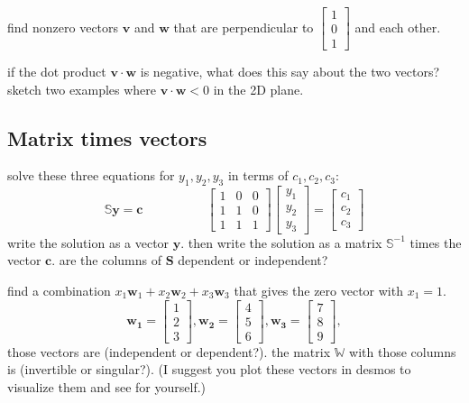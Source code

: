 \documentclass[addpoints]{exam}
\begin{document}
\begin{questions}
	\question find nonzero vectors $\mathbf{v}$ and $\mathbf{w}$ that are perpendicular to $\begin{bmatrix}  1\\0\\1 \end{bmatrix}$ and each other.
	
	\question if the dot product $\mathbf{v}\cdot \mathbf{w}$ is negative, what does this say about the two vectors? sketch two examples where $\mathbf{v}\cdot \mathbf{w} < 0$ in the 2D plane.
	 
	 \subsection*{Matrix times vectors}
	 
	 \question solve these three equations for $y_1, y_2, y_3$ in terms of $c_1, c_2, c_3$:
	 \begin{equation*}
	  \mathbb{S}\mathbf{y}=\mathbf{c} \hspace{5em} 
	  \begin{bmatrix} 1 & 0 & 0 \\ 1 & 1 & 0\\ 1 & 1 & 1 \end{bmatrix} 
	  \begin{bmatrix} y_1 \\ y_2 \\ y_3 \end{bmatrix} =
	  \begin{bmatrix} c_1 \\ c_2 \\ c_3 \end{bmatrix}
	 \end{equation*}
	 write the solution as a vector $\mathbf{y}$. then write the solution as a matrix $\mathbb{S}^{-1}$ times the vector $\mathbf{c}$. are the columns of $\mathbf{S}$ dependent or independent?
	 
	 \question find a combination $x_1\mathbf{w}_1+x_2\mathbf{w}_2+x_3\mathbf{w}_3$ that gives the zero vector with $x_1=1$. 
	 \begin{equation*}
		\mathbf{w_1} = \begin{bmatrix} 1 \\ 2 \\3 \end{bmatrix}, \mathbf{w_2} = \begin{bmatrix} 4 \\ 5 \\6 \end{bmatrix}, \mathbf{w_3} = \begin{bmatrix} 7 \\ 8 \\9 \end{bmatrix}, 
	\end{equation*}
	 those vectors are \fillin (independent or dependent?). the matrix $\mathbb{W}$ with those columns is \fillin (invertible or singular?). (I suggest you plot these vectors in desmos to visualize them and see for yourself.)
	

\end{questions}
\end{document}
